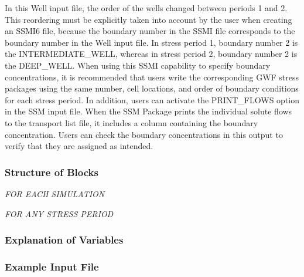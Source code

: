 \noindent In this Well input file, the order of the wells changed between periods 1 and 2.  This reordering must be explicitly taken into account by the user when creating an SSMI6 file, because the boundary number in the SSMI file corresponds to the boundary number in the Well input file.  In stress period 1, boundary number 2 is the INTERMEDIATE\_WELL, whereas in stress period 2, boundary number 2 is the DEEP\_WELL.  When using this SSMI capability to specify boundary concentrations, it is recommended that users write the corresponding GWF stress packages using the same number, cell locations, and order of boundary conditions for each stress period.   In addition, users can activate the PRINT\_FLOWS option in the SSM input file.  When the SSM Package prints the individual solute flows to the transport list file, it includes a column containing the boundary concentration.  Users can check the boundary concentrations in this output to verify that they are assigned as intended.

\vspace{5mm}
\subsubsection{Structure of Blocks}
\vspace{5mm}

\noindent \textit{FOR EACH SIMULATION}


\vspace{5mm}
\noindent \textit{FOR ANY STRESS PERIOD}


\vspace{5mm}
\subsubsection{Explanation of Variables}
\begin{description}

\end{description}

\subsubsection{Example Input File}

